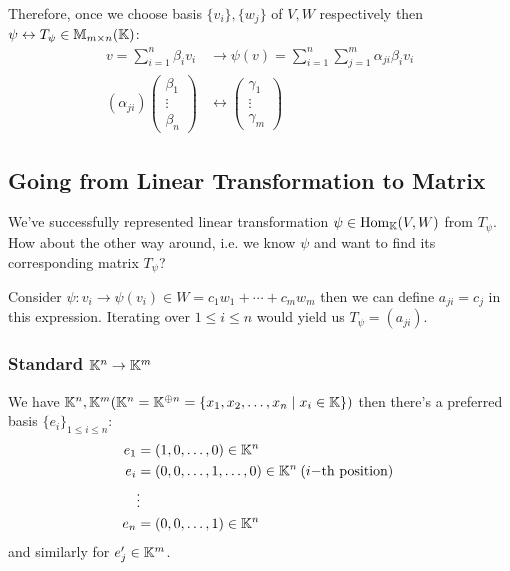 Therefore, once we choose basis \(\{v_i\}, \{w_j\}\) of \(V, W\) respectively then \(\psi \leftrightarrow T_\psi \in \mathbb{M}_{m \times n}(\mathbb{K})\):
\begin{align*}
    v = \sum_{i=1}^{n} \beta_i v_i       & \rightarrow \psi(v) = \sum_{i=1}^{n} \sum_{j=1}^{m} \alpha_{ji} \beta_i v_i \\
    (\alpha_{ji}) \begin{pmatrix}
                                \beta_1 \\ \vdots \\ \beta_n
                            \end{pmatrix} & \leftrightarrow \begin{pmatrix}
                                                                           \gamma_1 \\ \vdots \\ \gamma_m
                                                                       \end{pmatrix}
\end{align*}

\subsection{Going from Linear Transformation to Matrix}
We've successfully represented linear transformation \(\psi \in \mathrm{Hom}_{\mathbb{K}}(V, W)\) from \(T_\psi\). How about the other way around, i.e. we know \(\psi\) and want to find its corresponding matrix \(T_\psi\)?

Consider \(\psi: v_i \to \psi(v_i) \in W = c_1 w_1 + \cdots + c_m w_m\) then we can define \(a_{ji} = c_j\) in this expression. Iterating over \(1 \leq i \leq n\) would yield us \(T_\psi = (a_{ji})\).

\subsubsection{Standard \(\mathbb{K}^n \to \mathbb{K}^m\)}
We have \(\mathbb{K}^n, \mathbb{K}^m (\mathbb{K}^n = \mathbb{K}^{\oplus n} = \{x_1, x_2, \ldots, x_n \mid x_i \in \mathbb{K}\})\) then there's a preferred basis \(\{e_i\}_{1 \leq i \leq n}\):
\begin{align*}
    e_1 & = (1, 0, \ldots, 0) \in \mathbb{K}^n                                            \\
    e_i & = (0, 0, \ldots, 1, \ldots, 0) \in \mathbb{K}^n  \:\text{(\(i-\)th position)}\: \\
        & \vdots                                                                    \\
    e_n & = (0, 0, \ldots, 1) \in \mathbb{K}^n
\end{align*}
and similarly for \(e'_j \in \mathbb{K}^m\).

